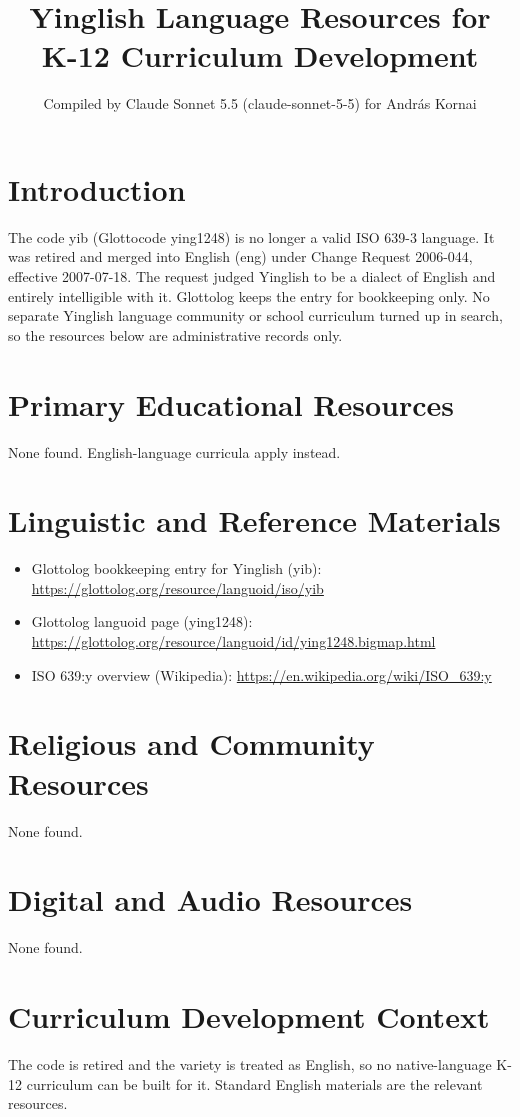 \documentclass[12pt]{article}
\title{Yinglish Language Resources for K-12 Curriculum Development}
\author{Compiled by Claude Sonnet 5.5 (claude-sonnet-5-5) for Andr\'as Kornai}
\date{}
\begin{document}
\maketitle

\section{Introduction}
The code yib (Glottocode ying1248) is no longer a valid ISO 639-3 language. It was retired and merged into English (eng) under Change Request 2006-044, effective 2007-07-18. The request judged Yinglish to be a dialect of English and entirely intelligible with it. Glottolog keeps the entry for bookkeeping only. No separate Yinglish language community or school curriculum turned up in search, so the resources below are administrative records only.

\section{Primary Educational Resources}
None found. English-language curricula apply instead.

\section{Linguistic and Reference Materials}
\begin{itemize}
\item Glottolog bookkeeping entry for Yinglish (yib): \url{https://glottolog.org/resource/languoid/iso/yib}
\item Glottolog languoid page (ying1248): \url{https://glottolog.org/resource/languoid/id/ying1248.bigmap.html}
\item ISO 639:y overview (Wikipedia): \url{https://en.wikipedia.org/wiki/ISO_639:y}
\end{itemize}

\section{Religious and Community Resources}
None found.

\section{Digital and Audio Resources}
None found.

\section{Curriculum Development Context}
The code is retired and the variety is treated as English, so no native-language K-12 curriculum can be built for it. Standard English materials are the relevant resources.
\end{document}
